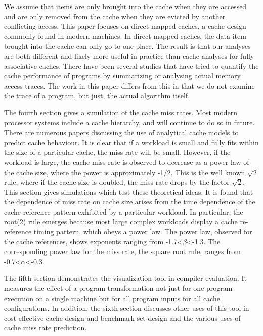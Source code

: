 \documentclass[14pt]{article}
\begin{document}
We assume that items are only brought into the cache when they are accessed and are only removed from the cache when they are evicted by another conflicting access. This paper focuses on direct mapped caches, a cache design commonly found in modern machines. In direct-mapped caches, the data item brought into the cache can only go to one place. The result is that our analyses are both different and likely more useful in practice than cache analyses for fully associative caches. There have been several studies that have tried to quantify the cache performance of programs by summarizing or analysing actual memory access traces. The work in this paper differs from this in that we do not examine the trace of a program, but just, the actual algorithm itself. 

The fourth section gives a simulation of the cache miss rates. Most modern processor systems include a cache hierarchy, and will continue to do so in future. There are numerous papers discussing the use of analytical cache models to predict cache behaviour.  It is clear that if a workload is small and fully fits within the size of a particular cache, the miss rate will be small. However, if the workload is large, the cache miss rate is observed to decrease as a power law of the cache size, where the power is approximately -1/2. This is the well known $\sqrt{2}$ rule, where if the cache size is doubled, the miss rate drops by the factor $\sqrt{2}$.  This section gives simulations which test these theoretical ideas. It is found that the dependence of miss rate on cache size arises from the time dependence of the cache reference pattern exhibited by a particular workload. In particular, the root(2) rule emerges because most large complex workloads display a cache re-reference timing pattern, which obeys a power law. The power law, observed for the cache references, shows exponents ranging from -1.7<$\beta$<-1.3. The corresponding power law for the miss rate, the square root rule, ranges from -0.7<$\alpha$<-0.3. 

The fifth section demonstrates the visualization tool in compiler evaluation. It measures the effect of a program transformation not just for one program execution on a single machine but for all program inputs for all cache configurations. In addition, the sixth section discusses other uses of this tool in cost effective cache design and benchmark set design and the various uses of cache miss rate prediction.
\end{document}
